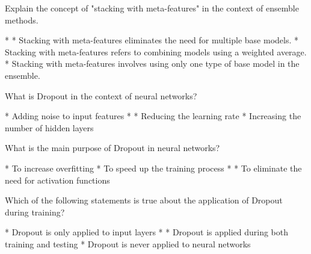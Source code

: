 \documentclass[10pt]{extarticle}
\begin{document}
\begin{exercise}
    Explain the concept of "stacking with meta-features" in the context of ensemble methods.
    \begin{choice}
        * 
        * Stacking with meta-features eliminates the need for multiple base models.
        * Stacking with meta-features refers to combining models using a weighted average.
        * Stacking with meta-features involves using only one type of base model in the ensemble.
    \end{choice}
\end{exercise}
\begin{solution}
\end{solution}

\begin{exercise}
    What is Dropout in the context of neural networks?
    \begin{choice}
        * Adding noise to input features
        * 
        * Reducing the learning rate
        * Increasing the number of hidden layers
    \end{choice}
\end{exercise}
\begin{solution}
\end{solution}

\begin{exercise}
    What is the main purpose of Dropout in neural networks?
    \begin{choice}
        * To increase overfitting
        * To speed up the training process
        * 
        * To eliminate the need for activation functions
    \end{choice}
\end{exercise}
\begin{solution}
\end{solution}

\begin{exercise}
    Which of the following statements is true about the application of Dropout during training?
    \begin{choice}
        * Dropout is only applied to input layers
        * 
        * Dropout is applied during both training and testing
        * Dropout is never applied to neural networks
    \end{choice}
\end{exercise}
\begin{solution}
\end{solution}
\end{document}
